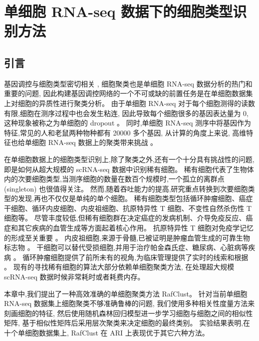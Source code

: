 \section{单细胞 RNA-seq 数据下的细胞类型识别方法}
\label{sec:rafclust}

\subsection{引言}

基因调控与细胞类型密切相关 ,
细胞聚类也是单细胞 RNA-seq 数据分析的热门和重要的问题, 
因此构建基因调控网络的一个不可或缺的前置任务是在单细胞数据集上对细胞的异质性进行聚类分析。
由于单细胞 RNA-seq 对于每个细胞测得的读数有限,细胞在测序过程中也会发生粘连,
因此导致每个细胞很多的基因表达量为 0,
这种现象被称之为单细胞的 dropout 。
同时,单细胞 RNA-seq 测序中将基因作为特征,常见的人和老鼠两种物种都有 20000 多个基因,
从计算的角度上来说, 高维特征也给单细胞 RNA-seq 数据上的聚类带来挑战 。

在单细胞数据上的细胞类型识别上,除了聚类之外,还有一个十分具有挑战性的问题,即是如何从超大规模的 scRNA-seq 数据中识别稀有细胞。
稀有细胞代表了生物体内的次要细胞类型,当测序细胞的数量在数百个规模时,一个孤立的离群点 (singleton) 也很值得关注。
然而,随着吞吐能力的提高,研究重点转换到次要细胞类型的发现,再也不仅仅是单纯的单个细胞。
稀有细胞类型包括循环肿瘤细胞、癌症干细胞、循环内皮细胞、内皮祖细胞、抗原特异性 T 细胞、不变性自然杀伤性 T 细胞等。
尽管丰度较低,但稀有细胞群在决定癌症的发病机制、介导免疫反应、癌症和其它疾病的血管生成等方面起着核心作用。
抗原特异性 T 细胞对免疫学记忆的形成至关重要 。
内皮祖细胞,来源于骨髓,已被证明是肿瘤血管生成的可靠生物标志物 。
干细胞可以替代受损细胞,并用于治疗帕金森氏症、糖尿病、心脏病等疾病 。
循环肿瘤细胞提供了前所未有的视角,为临床管理提供了实时的线索和根据 。
现有的寻找稀有细胞的算法大部分依赖单细胞聚类方法,
在处理超大规模 scRNA-seq 数据时候非常耗时或者耗费内存。

本章中,我们提出了一种高效准确的单细胞聚类方法 RafClust。
针对当前单细胞 RNA-seq 数据集上细胞聚类不够准确鲁棒的问题,
我们使用多种相关性度量方法来刻画细胞的特征, 
然后使用随机森林回归模型进一步学习细胞与细胞之间的相似性矩阵,
基于相似性矩阵后采用层次聚类来决定细胞的最终类别。
实验结果表明,在十个单细胞数据集上, RafClust 在 ARI 上表现优于其它六种方法。

